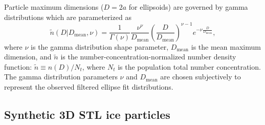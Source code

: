 \documentclass[amt, manuscript]{copernicus}
\begin{document}



Particle maximum dimensions ($D = 2 a$ for ellipsoids) are governed by gamma distributions which are parameterized as
\begin{equation}
\tilde{n}(D|D_{\mathrm{mean}},\nu) = \frac{1}{\Gamma(\nu)} \frac{\nu^{\nu}}{D_{\mathrm{mean}}} \left( \frac{D}{D_{\mathrm{mean}}}\right)^{\nu-1} e^{- \nu \frac{D}{D_{\mathrm{mean}}}},
\end{equation}
where $\nu$ is the gamma distribution shape parameter,  $D_{\mathrm{mean}}$ is the mean maximum dimension, and $\tilde{n}$ is the number-concentration-normalized number density function: $\tilde{n} \equiv n(D)/N_{t}$, where $N_{t}$ is the population total number concentration. The gamma distribution parameters $\nu$ and $D_{\mathrm{mean}}$ are chosen subjectively to represent the observed filtered ellipse fit distributions.



\subsection{Synthetic 3D STL ice particles}\label{sect:STL}
\end{document}
